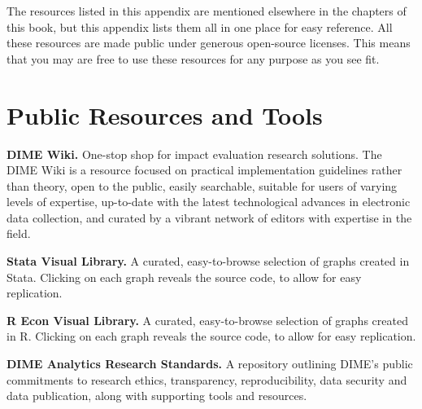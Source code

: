 
\newcommand{\resourcepar}{\vspace{.75\baselineskip}\noindent}


\begin{fullwidth}

The resources listed in this appendix are mentioned elsewhere in
the chapters of this book, but this appendix lists them all in one place for easy reference. All
these resources are made public under generous open-source licenses. This means
that you may are free to use these resources for any purpose as you see fit.

\end{fullwidth}


\section{Public Resources and Tools}

\textbf{DIME Wiki.}
One-stop shop for impact evaluation research solutions. The DIME Wiki is a resource focused on practical implementation guidelines rather than theory, open to the public, easily searchable, suitable for users of varying levels of expertise, up-to-date with the latest technological advances in electronic data collection, and curated by a vibrant network of editors with expertise in the field.

\resourcepar\textbf{Stata Visual Library.}
A curated, easy-to-browse selection of graphs created in Stata. Clicking on each graph reveals the source code, to allow for easy replication. 

\resourcepar\textbf{R Econ Visual Library.}
A curated, easy-to-browse selection of graphs created in R. Clicking on each graph reveals the source code, to allow for easy replication. 

\resourcepar\textbf{DIME Analytics Research Standards.}
A repository outlining DIME's public commitments to research ethics, transparency, reproducibility, data security and data publication, along with supporting tools and resources. 


